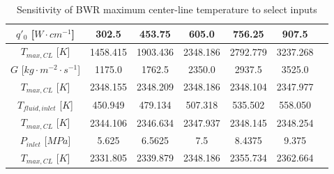 \documentclass{article}
\begin{document}
\begin{table}[!hp!]
    \centering
    \renewcommand{\arraystretch}{1.5}
    \caption{Sensitivity of BWR maximum center-line temperature to select inputs}
    \label{tab:bwrsens}
    \begin{tabular}{|c|c|c|c|c|c|c|}
        \toprule
        \bottomrule
        $q'_{0}$  [$W\cdot cm^{-1}$] & 302.5 & 453.75 & 605.0 & 756.25 & 907.5 \\
        \hline
        $T_{max,CL}$  [$K$] & 1458.415 & 1903.436 & 2348.186 & 2792.779 & 3237.268 \\
        \toprule
        \bottomrule
        $G$  [$kg\cdot m^{-2} \cdot s^{-1}$] & 1175.0 & 1762.5 & 2350.0 & 2937.5 & 3525.0 \\
        \hline
        $T_{max,CL}$  [$K$] & 2348.155 & 2348.209 & 2348.186 & 2348.104 & 2347.977 \\
        \toprule
        \bottomrule
        $T_{fluid,inlet}$  [$K$] & 450.949 & 479.134 & 507.318 & 535.502 & 558.050 \\
        \hline
        $T_{max,CL} $ [$K$] & 2344.106 & 2346.634 & 2347.937 & 2348.145 & 2348.254 \\
        \toprule
        \bottomrule
        $P_{inlet}$  [$MPa$] & 5.625 & 6.5625 & 7.5 & 8.4375 & 9.375 \\
        \hline
        $T_{max,CL}$ [$K$] & 2331.805 & 2339.879 & 2348.186 & 2355.734 & 2362.664 \\
        \toprule
    \end{tabular}
\end{table}
\end{document}
